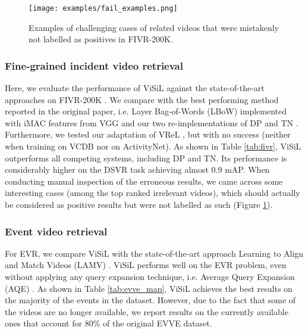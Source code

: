 \documentclass[10pt,twocolumn,letterpaper]{article}
\begin{document}
\begin{figure}[t]
\centering
\texttt{[image: examples/fail\_examples.png]}
\caption{Examples of challenging cases of related videos that were mistakenly not labelled as positives in FIVR-200K.}
\label{fig:fail_examples}
\end{figure}



\subsubsection{Fine-grained incident video retrieval}
\label{sec:fivr}

Here, we evaluate the performance of ViSiL against the state-of-the-art approaches on FIVR-200K \cite{kordopatis2018}. We compare with the best performing method reported in the original paper, i.e. Layer Bag-of-Words (LBoW) \cite{kordopatis2017a} implemented with iMAC features from VGG \cite{simonyan2014} and our two re-implementations of DP \cite{chou2015} and TN \cite{tan2009}. Furthermore, we tested our adaptation of VReL \cite{feng2018}, but with no success (neither when training on VCDB nor on ActivityNet). As shown in Table \ref{tab:fivr}, ViSiL outperforms all competing systems, including DP and TN. Its performance is considerably higher on the DSVR task achieving almost 0.9 mAP. When conducting manual inspection of the erroneous results, we came across some interesting cases (among the top ranked irrelevant videos), which should actually be considered as positive results but were not labelled as such  (Figure \ref{fig:fail_examples}).





\subsubsection{Event video retrieval}
\label{sec:evr}

For EVR, we compare ViSiL with the state-of-the-art approach Learning to Align and Match Videos (LAMV) \cite{baraldi2018}. ViSiL performs well on the EVR problem, even without applying any query expansion technique, i.e. Average Query Expansion (AQE) \cite{douze2013}. As shown in Table \ref{tab:evve_map}, ViSiL achieves the best results on the majority of the events in the dataset. However, due to the fact that some of the videos are no longer available, we report results on the currently available ones that account for 80\% of the original EVVE dataset.
\end{document}
